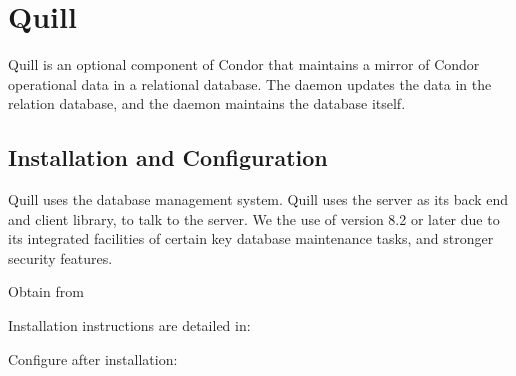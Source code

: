 \section{\label{sec:Quill}Quill}

Quill is an optional component of Condor that maintains a mirror 
of Condor operational data
in a relational database.  The  daemon updates
the data in the relation database, and the  daemon
maintains the database itself.

\subsection{\label{sec:Quill-Installation}Installation and Configuration}

Quill uses the  database management system.
Quill uses the  server as its back end
and client library, 
 to talk to the server.
We  the use of version 
8.2 or later due to its integrated facilities of certain key 
database maintenance tasks, and stronger security features.

Obtain  from


Installation instructions are detailed in:

Configure  after installation:


